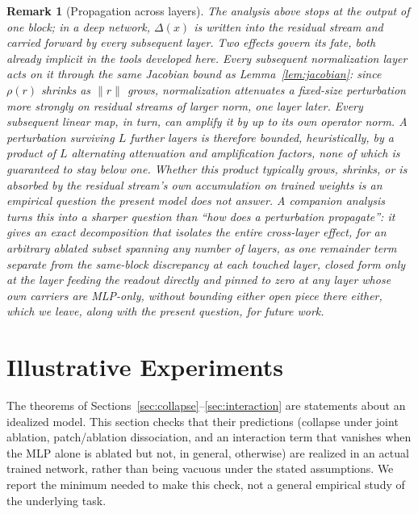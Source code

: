 \documentclass[11pt,a4paper]{article}
\newtheorem{remark}{Remark}
\begin{document}
\begin{remark}[Propagation across layers]
\label{rem:propagation}
The analysis above stops at the output of one block; in a deep network,
$\Delta(x)$ is written into the residual stream and carried forward by every
subsequent layer. Two effects govern its fate, both already implicit in the
tools developed here. Every subsequent normalization layer acts on it through
the same Jacobian bound as Lemma~\ref{lem:jacobian}: since $\rho(r)$ shrinks
as $\|r\|$ grows, normalization attenuates a fixed-size perturbation more
strongly on residual streams of larger norm, one layer later. Every
subsequent linear map, in turn, can amplify it by up to its own operator
norm. A perturbation surviving $L$ further layers is therefore bounded,
heuristically, by a product of $L$ alternating attenuation and amplification
factors, none of which is guaranteed to stay below one. Whether this product
typically grows, shrinks, or is absorbed by the residual stream's own
accumulation on trained weights is an empirical question the present model
does not answer. A companion analysis turns this into a sharper question than
``how does a perturbation propagate'': it gives an exact decomposition that
isolates the entire cross-layer effect, for an arbitrary ablated subset
spanning any number of layers, as one remainder term separate from the
same-block discrepancy at each touched layer, closed form only at the layer
feeding the readout directly and pinned to zero at any layer whose own
carriers are MLP-only, without bounding either open piece there either, which
we leave, along with the present question, for future work.
\end{remark}

\section{Illustrative Experiments}
\label{sec:experiments}

The theorems of Sections~\ref{sec:collapse}--\ref{sec:interaction} are
statements about an idealized model. This section checks that their
predictions (collapse under joint ablation, patch/ablation dissociation,
and an interaction term that vanishes when the MLP alone is ablated but not,
in general, otherwise) are realized in an actual trained network, rather
than being vacuous under the stated assumptions. We report the minimum
needed to make this check, not a general empirical study of the underlying
task.
\end{document}
